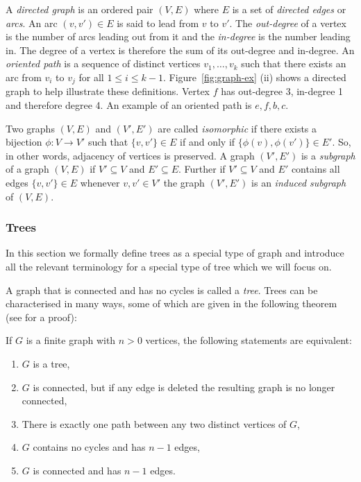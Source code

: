 A \textit{directed graph} is an ordered pair $(V,E)$ where $E$ is a set of
\textit{directed edges} or \textit{arcs}.  An arc $(v,v') \in E$ is said to
lead from $v$ to $v'$.  The \textit{out-degree} of a vertex is the number of
arcs leading out from it and the \textit{in-degree} is the number leading in.
The degree of a vertex is therefore the sum of its out-degree and in-degree.
An \textit{oriented path} is a sequence of distinct vertices $v_1,\dotsc,v_k$
such that there exists an arc from $v_i$ to $v_j$ for all $1 \leq i \leq k-1$.
Figure~\ref{fig:graph-ex} (ii) shows a directed graph to help illustrate these
definitions.  Vertex $f$ has out-degree 3, in-degree 1 and therefore degree 4.
An example of an oriented path is $e,f,b,c$.

Two graphs $(V,E)$ and $(V',E')$ are called \textit{isomorphic} if there
exists a bijection $\phi \colon V \to V'$ such that $\{v,v'\} \in E$ if and
only if $\{\phi(v),\phi(v')\} \in E'$.  So, in other words, adjacency of
vertices is preserved.  A graph $(V',E')$ is a \textit{subgraph} of a graph
$(V,E)$ if $V' \subseteq V$ and $E' \subseteq E$.  Further if $V' \subseteq V$
and $E'$ contains all edges $\{v,v'\} \in E$ whenever $v,v' \in V'$ the graph
$(V',E')$ is an \textit{induced subgraph} of $(V,E)$.

\subsubsection{Trees}
\label{sec:trees}

In this section we formally define trees as a special type of graph and
introduce all the relevant terminology for a special type of tree which we
will focus on.

A graph that is connected and has no cycles is called a
\textit{tree}.  Trees can be characterised in many ways, some of which are
given in the following theorem (see \cite[][Section 2.3.4.1]{knuth97taocp1}
for a proof):

\begin{thm}
  If $G$ is a finite graph with $n > 0$ vertices, the following statements are
  equivalent:
  \begin{enumerate}[label=\alph*)]
  \item $G$ is a tree,
  \item $G$ is connected, but if any edge is deleted the resulting graph is no
    longer connected,
  \item There is exactly one path between any two distinct vertices of $G$,
  \item $G$ contains no cycles and has $n-1$ edges,
  \item $G$ is connected and has $n-1$ edges.
  \end{enumerate}
\end{thm}

